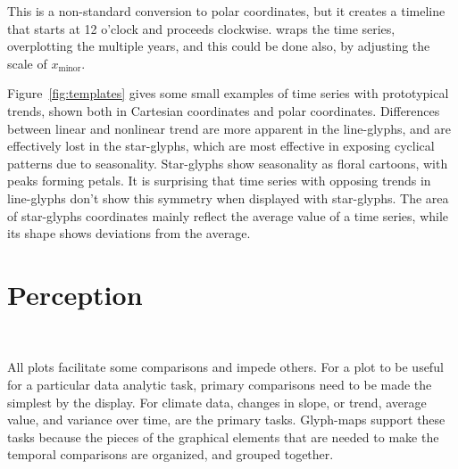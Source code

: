 \documentclass[oneside]{article}
\newcommand\amin{\text{minor}}
\begin{document}
\noindent This is a non-standard conversion to polar coordinates, but it creates a timeline that starts at 12 o'clock and proceeds clockwise. \citet{eden:2010} wraps the time series, overplotting the multiple years, and this could be done also, by adjusting the scale of $x_{\amin}$. 

%
% 
% 
%     
%   

Figure~\ref{fig:templates} gives some small examples of time series with prototypical trends, shown both in Cartesian coordinates and polar coordinates. Differences between linear and nonlinear trend are more apparent in the line-glyphs, and are effectively lost in the star-glyphs, which are most effective in exposing cyclical patterns due to seasonality. Star-glyphs show seasonality as floral cartoons, with peaks forming petals. It is surprising that time series with opposing trends in line-glyphs don't show this symmetry when displayed with star-glyphs. The area of star-glyphs coordinates mainly reflect the average value of a time series, while its shape shows deviations from the average.

\section{Perception}~\label{sec:perception}

All plots facilitate some comparisons and impede others. For a plot to be useful for a particular data analytic task, primary comparisons need to be made the simplest by the display. For climate data, changes in slope, or trend, average value, and variance over time, are the primary tasks. Glyph-maps support these tasks because the pieces of the graphical elements that are needed to make the temporal comparisons are organized, and grouped together.
\end{document}
